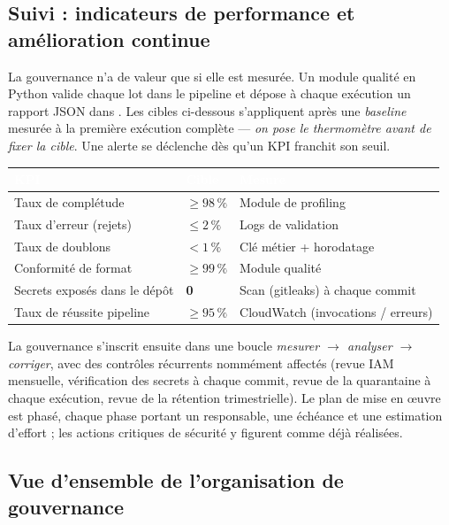 \documentclass[11pt]{article}
\newcommand{\thead}[1]{\textbf{\textcolor{white}{#1}}}
\newcommand{\code}[1]{\texttt{\seqsplit{#1}}}
\begin{document}
\subsection{Suivi : indicateurs de performance et amélioration continue}

La gouvernance n'a de valeur que si elle est mesurée. Un module qualité en Python
valide chaque lot dans le pipeline et dépose à chaque exécution un rapport JSON dans
\code{quality\_reports/YYYY/MM/DD/}. Les cibles ci-dessous s'appliquent après une
\textit{baseline} mesurée à la première exécution complète --- \emph{on pose le
thermomètre avant de fixer la cible}. Une alerte se déclenche dès qu'un KPI franchit
son seuil.

\begin{center}
\begin{tabularx}{\linewidth}{@{}>{\raggedright\arraybackslash}X>{\raggedright\arraybackslash}p{2.6cm}>{\raggedright\arraybackslash}p{3.4cm}@{}}
\toprule
\rowcolor{tableHeader}
\thead{KPI} & \thead{Cible} & \thead{Mesure} \\
\midrule
Taux de complétude & $\geq 98\,\%$ & Module de profiling \\
Taux d'erreur (rejets) & $\leq 2\,\%$ & Logs de validation \\
Taux de doublons & $< 1\,\%$ & Clé métier + horodatage \\
Conformité de format & $\geq 99\,\%$ & Module qualité \\
Secrets exposés dans le dépôt & \textbf{0} & Scan (gitleaks) à chaque commit \\
Taux de réussite pipeline & $\geq 95\,\%$ & CloudWatch (invocations / erreurs) \\
\bottomrule
\end{tabularx}
\end{center}

La gouvernance s'inscrit ensuite dans une boucle \emph{mesurer $\rightarrow$ analyser
$\rightarrow$ corriger}, avec des contrôles récurrents nommément affectés (revue IAM
mensuelle, vérification des secrets à chaque commit, revue de la quarantaine à chaque
exécution, revue de la rétention trimestrielle). Le plan de mise en œuvre est phasé,
chaque phase portant un responsable, une échéance et une estimation d'effort ; les
actions critiques de sécurité y figurent comme déjà réalisées.

\subsection{Vue d'ensemble de l'organisation de gouvernance}
\end{document}
